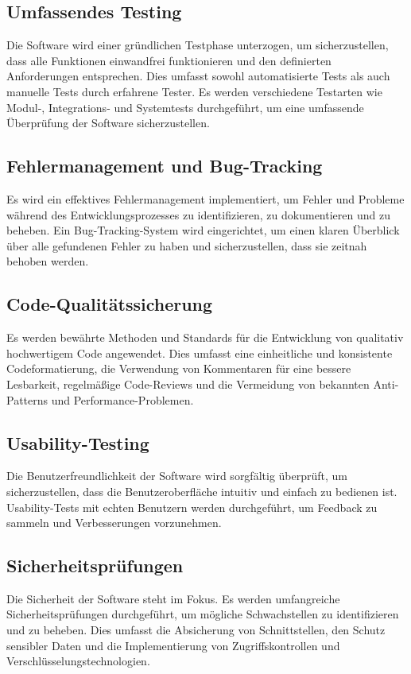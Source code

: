 \documentclass[12pt]{article}
\begin{document}
	\subsection{Umfassendes Testing}
	Die Software wird einer gründlichen Testphase unterzogen, um sicherzustellen, dass alle Funktionen einwandfrei funktionieren und den definierten Anforderungen entsprechen. Dies umfasst sowohl automatisierte Tests als auch manuelle Tests durch erfahrene Tester. Es werden verschiedene Testarten wie Modul-, Integrations- und Systemtests durchgeführt, um eine umfassende Überprüfung der Software sicherzustellen.
	
	\subsection{Fehlermanagement und Bug-Tracking}
	Es wird ein effektives Fehlermanagement implementiert, um Fehler und Probleme während des Entwicklungsprozesses zu identifizieren, zu dokumentieren und zu beheben. Ein Bug-Tracking-System wird eingerichtet, um einen klaren Überblick über alle gefundenen Fehler zu haben und sicherzustellen, dass sie zeitnah behoben werden.
	
	\subsection{Code-Qualitätssicherung}
	Es werden bewährte Methoden und Standards für die Entwicklung von qualitativ hochwertigem Code angewendet. Dies umfasst eine einheitliche und konsistente Codeformatierung, die Verwendung von Kommentaren für eine bessere Lesbarkeit, regelmäßige Code-Reviews und die Vermeidung von bekannten Anti-Patterns und Performance-Problemen.
	
	\subsection{Usability-Testing}
	Die Benutzerfreundlichkeit der Software wird sorgfältig überprüft, um sicherzustellen, dass die Benutzeroberfläche intuitiv und einfach zu bedienen ist. Usability-Tests mit echten Benutzern werden durchgeführt, um Feedback zu sammeln und Verbesserungen vorzunehmen.
	
	\subsection{Sicherheitsprüfungen}
	Die Sicherheit der Software steht im Fokus. Es werden umfangreiche Sicherheitsprüfungen durchgeführt, um mögliche Schwachstellen zu identifizieren und zu beheben. Dies umfasst die Absicherung von Schnittstellen, den Schutz sensibler Daten und die Implementierung von Zugriffskontrollen und Verschlüsselungstechnologien.
	
\end{document}
